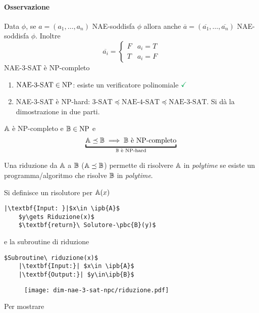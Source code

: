 \paragraph{Osservazione} Data $\phi$, se $a=(a_1,\dots,a_n)$ NAE-soddisfa $\phi$ allora anche $\overline{a}=(\overline{a_1},\dots,\overline{a_n})$ NAE-soddisfa $\phi$. Inoltre \begin{equation*}
	\overline{a_i}=\begin{cases}
		F & a_i=T\\ T & a_i=F
		\end{cases}
\end{equation*}
NAE-3-SAT è NP-completo
\begin{enumerate}
	\item $\text{NAE-3-SAT}\in \text{NP}$: esiste un verificatore polinomiale $\color{Green}\checkmark$
	\item NAE-3-SAT è NP-hard: $\text{3-SAT}\preceq\text{NAE-4-SAT}\preceq\text{NAE-3-SAT}$. Si dà la dimostrazione in due parti.
\end{enumerate}
\begin{definition}
	$\mathbb{A}$ è NP-completo e $\mathbb{B}\in\text{NP}$ e \[\underbracket{\pbc{A}\preceq\pbc{B}\implies \pbc{B}\ \text{è NP-completo}}_{\text{$\pbc{B}$ è NP-hard}}\]
	
	Una riduzione da $\mathbb{A}$ a $\mathbb{B}$ ($\mathbb{A}\preceq\mathbb{B}$) permette di risolvere $\mathbb{A}$ in \textit{polytime} se esiste un programma/algoritmo che risolve $\mathbb{B}$ in \textit{polytime}.
\end{definition}
Si definisce un risolutore per $\mathbb{A}(x)$
\begin{lstlisting}[mathescape, escapeinside=||,frame=single]
	|\textbf{Input: }|$x\in \ipb{A}$
	$y\gets Riduzione(x)$
	$\textbf{return}\ Solutore-\pbc{B}(y)$
\end{lstlisting}
e la subroutine di riduzione
\begin{lstlisting}[mathescape, escapeinside=||,frame=single]
	$Subroutine\ riduzione(x)$
	|\textbf{Input:}| $x\in \ipb{A}$
	|\textbf{Output:}| $y\in\ipb{B}$
\end{lstlisting}
\begin{figure}[thbp]
	\centering
	\texttt{[image: dim-nae-3-sat-npc/riduzione.pdf]}
	\caption{}
	\label{fig:}
\end{figure}

\begin{demonstration}
	Per mostrare 
\end{demonstration}
